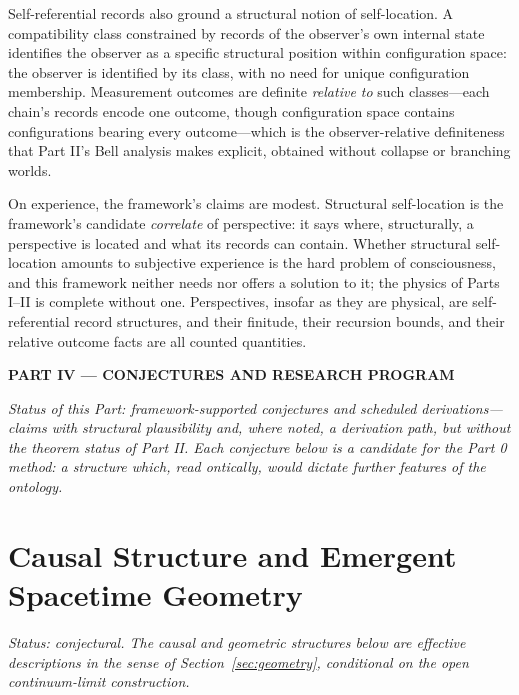 \documentclass[11pt]{article}
\theoremstyle{definition}
\theoremstyle{remark}
\newcommand{\partheader}[1]{\clearpage\begin{center}{\LARGE\bfseries #1}\end{center}\vspace{1em}}
\begin{document}
Self-referential records also ground a structural notion of self-location. A compatibility class constrained by records of the observer's own internal state identifies the observer as a specific structural position within configuration space: the observer is identified by its class, with no need for unique configuration membership. Measurement outcomes are definite \emph{relative to} such classes---each chain's records encode one outcome, though configuration space contains configurations bearing every outcome---which is the observer-relative definiteness that Part II's Bell analysis makes explicit, obtained without collapse or branching worlds.

On experience, the framework's claims are modest. Structural self-location is the framework's candidate \emph{correlate} of perspective: it says where, structurally, a perspective is located and what its records can contain. Whether structural self-location amounts to subjective experience is the hard problem of consciousness, and this framework neither needs nor offers a solution to it; the physics of Parts I--II is complete without one. Perspectives, insofar as they are physical, are self-referential record structures, and their finitude, their recursion bounds, and their relative outcome facts are all counted quantities.
\partheader{PART IV --- CONJECTURES AND RESEARCH PROGRAM}
\emph{Status of this Part: framework-supported conjectures and scheduled derivations---claims with structural plausibility and, where noted, a derivation path, but without the theorem status of Part II. Each conjecture below is a candidate for the Part 0 method: a structure which, read ontically, would dictate further features of the ontology.}

\section{Causal Structure and Emergent Spacetime Geometry}\label{sec:causal}
\emph{Status: conjectural. The causal and geometric structures below are effective descriptions in the sense of Section~\ref{sec:geometry}, conditional on the open continuum-limit construction.}
\end{document}
